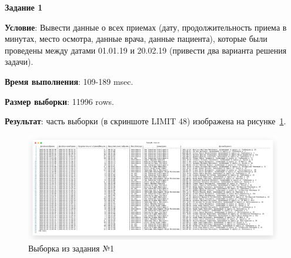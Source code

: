











\begin{center}
\textbf{Задание 1}
\end{center}

\textbf{Условие}:
Вывести данные о всех приемах (дату, продолжительность приема в минутах, место
осмотра, данные врача, данные пациента), которые были проведены между датами
01.01.19 и 20.02.19 (привести два варианта решения задачи).



\textbf{Время выполнения}: 109-189 msec.

\textbf{Размер выборки}: 11996 rows.

\textbf{Результат}: часть выборки (в скриншоте LIMIT 48) изображена на рисунке~\ref{fig:t1}.

\begin{figure}[!h]
  \centering

  \includegraphics[width=18cm]
  {../sql/task1/1-out.png}

  \caption{Выборка из задания №1}

  \label{fig:t1}
\end{figure}

